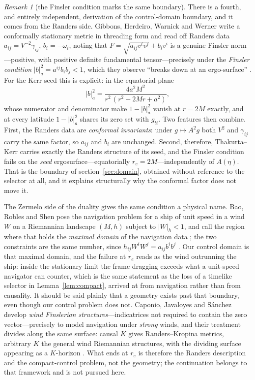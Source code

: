 \documentclass[12pt]{iopart}
\theoremstyle{plain}
\theoremstyle{definition}
\theoremstyle{remark}
\newtheorem{remark}[proposition]{Remark}
\begin{document}
\begin{remark}[the Finsler condition marks the same boundary]
\label{rmk:finsler-domain}
There is a fourth, and entirely independent, derivation of the control-domain
boundary, and it comes from the Randers side. Gibbons, Herdeiro, Warnick and Werner
write a conformally stationary metric in threading form and read off Randers data
$a_{ij}=V^{-2}\gamma_{ij}$, $b_i=-\omega_i$, noting that
$F=\sqrt{a_{ij}v^iv^j}+b_iv^i$ is a genuine Finsler norm---positive, with positive
definite fundamental tensor---precisely under the \emph{Finsler condition}
$|b|^2_a=a^{ij}b_ib_j<1$, which they observe ``breaks down at an ergo-surface''
\cite[\S2.1, \S3.4]{GibbonsRanders2009}. For the Kerr seed this is explicit: in the
equatorial plane
\begin{equation}
    |b|^2_a=\frac{4a^2M^2}{r^2\,(r^2-2Mr+a^2)} ,
    \label{eq:finsler-condition}
\end{equation}
whose numerator and denominator make $1-|b|^2_a$ vanish at $r=2M$ exactly, and at
every latitude $1-|b|^2_a$ shares its zero set with $g_{tt}$. Two features then
combine. First, the Randers data are \emph{conformal invariants}: under
$g\mapsto A^2g$ both $V^2$ and $\gamma_{ij}$ carry the same factor, so $a_{ij}$ and
$b_i$ are unchanged. Second, therefore, Thakurta--Kerr carries exactly the Randers
structure of its seed, and the Finsler condition fails on the \emph{seed}
ergosurface---equatorially $r_e=2M$---independently of $A(\eta)$. That is the
boundary of section~\ref{sec:domain}, obtained without reference to the selector at
all, and it explains structurally why the conformal factor does not move it.

The Zermelo side of the duality gives the same condition a physical name. Bao,
Robles and Shen pose the navigation problem for a ship of unit speed in a wind $W$
on a Riemannian landscape $(M,h)$ subject to $|W|_h<1$, and call the region where
that holds the \emph{maximal domain} of the navigation data
\cite[\S0.1]{BaoRoblesShen}; the two constraints are the same number, since
$h_{ij}W^iW^j=a_{ij}b^ib^j$ \cite[\S2.1]{GibbonsRanders2009}. Our control domain is
that maximal domain, and the failure at $r_e$ reads as the wind outrunning the
ship: inside the stationary limit the frame dragging exceeds what a unit-speed
navigator can counter, which is the same statement as the loss of a timelike
selector in Lemma~\ref{lem:compact}, arrived at from navigation rather than from
causality. It should be said plainly that a geometry exists past that boundary,
even though our control problem does not. Caponio, Javaloyes and S\'anchez develop
\emph{wind Finslerian structures}---indicatrices not required to contain the zero
vector---precisely to model navigation under \emph{strong} winds, and their
treatment divides along the same surface: causal $K$ gives Randers--Kropina
metrics, arbitrary $K$ the general wind Riemannian structures, with the dividing
surface appearing as a $K$-horizon
\cite[\S\S4--5,~8.3]{CaponioWind}. What ends at $r_e$ is therefore the Randers
description and the compact-control problem, not the geometry; the continuation
belongs to that framework and is not pursued here.


\end{remark}
\end{document}
